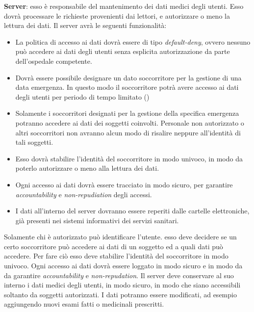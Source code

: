 \documentclass[a4paper,12pt]{report}
\begin{document}
\begin{description}
	\item \textbf{Server}: esso è responsabile del mantenimento dei dati medici degli utenti. Esso dovrà processare le richieste provenienti dai lettori, e autorizzare o meno la lettura dei dati. Il server avrà le seguenti funzionalità:
	\begin{itemize}
		\item La politica di accesso ai dati dovrà essere di tipo \emph{default-deny}, ovvero nessuno può accedere ai dati degli utenti senza esplicita autorizzazione da parte dell'ospedale competente. 
		\item Dovrà essere possibile designare un dato soccorritore per la gestione di una data emergenza. In questo modo il soccorritore potrà avere accesso ai dati degli utenti per periodo di tempo limitato ()
		\item Solamente i soccorritori designati per la gestione della specifica emergenza potranno accedere ai dati dei soggetti coinvolti. Personale non autorizzato o altri soccorritori non avranno alcun modo di risalire neppure all'identità di tali soggetti.
		\item Esso dovrà stabilire l'identità del soccorritore in modo univoco, in modo da poterlo autorizzare o meno alla lettura dei dati.  
		\item Ogni accesso ai dati dovrà essere tracciato in modo sicuro, per garantire \emph{accountability} e \emph{non-repudiation} degli accessi.
		\item I dati all'interno del server dovranno essere reperiti dalle cartelle elettroniche, già presenti nei sistemi informativi dei servizi sanitari. 
	\end{itemize}
	
	
	
	
	
	Solamente chi è autorizzato può identificare l'utente. esso deve decidere se un certo soccorritore può accedere ai dati di un soggetto ed a quali dati può accedere. Per fare ciò esso deve stabilire l'identità del soccorritore in modo univoco. Ogni accesso ai dati dovrà essere loggato in modo sicuro e in modo da da garantire \emph{accountability} e \emph{non-repudation}. Il server deve conservare al suo interno i dati medici degli utenti, in modo sicuro, in modo che siano accessibili soltanto da soggetti autorizzati. I dati potranno essere modificati, ad esempio aggiungendo nuovi esami fatti o medicinali prescritti. 
\end{description}
\end{document}
